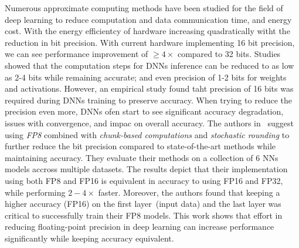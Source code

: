 Numerous approximate computing methods have been studied for the field of deep 
learning to reduce computation and data communication time, and energy cost.
With the energy efficientcy of hardware increasing quadratically witht the reduction in bit precision.
With current hardware implementing 16 bit precision, we can see performance improvement of $\ge 4\times$ compared to 32 bits.
Studies showed that the computation steps for DNNs inference can be reduced to as low as 2-4 bits
while remaining accurate; and even precision of 1-2 bits for weights and activations.
However, an empirical study found taht precision of 16 bits was required during 
DNNs training to preserve accuracy.
When trying to reduce the precision even more, DNNs ofen start to see significant 
accuracy degradation, issues with convergence, and impac on overall accuracy.
The authors in~\cite{Wang2018-oo} suggest using \textit{FP8} combined with 
\textit{chunk-based computations} and \textit{stochastic rounding} to further reduce
the bit precision compared to state-of-the-art methods while maintaining accuracy.
They evaluate their methods on a collection of 6 NNs models accross multiple datasets.
The results depict that their implementation using both FP8 and FP16 is equivalent
in accuracy to using FP16 and FP32, while performing $2-4\times$ faster.
Moreover, the authors found that keeping a higher accuracy (FP16) on the first layer~(input data)
and the last layer was critical to successfully train their FP8 models.
This work shows that effort in reducing floating-point precision in deep learning
can increase performance significantly while keeping accuracy equivalent.


